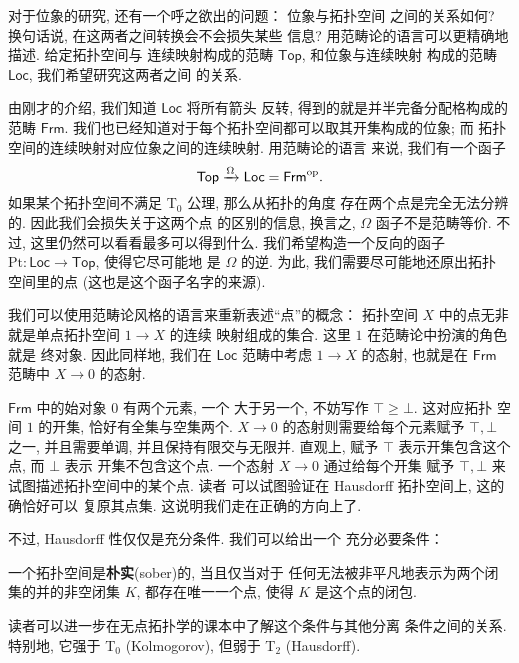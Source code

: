 对于位象的研究, 还有一个呼之欲出的问题： 位象与拓扑空间
之间的关系如何? 换句话说, 在这两者之间转换会不会损失某些
信息? 用范畴论的语言可以更精确地描述. 给定拓扑空间与
连续映射构成的范畴 \(\mathsf{Top}\), 和位象与连续映射
构成的范畴 \(\mathsf{Loc}\), 我们希望研究这两者之间
的关系.

由刚才的介绍, 我们知道 \(\mathsf{Loc}\) 将所有箭头
反转, 得到的就是并半完备分配格构成的范畴 \(\mathsf{Frm}\).
我们也已经知道对于每个拓扑空间都可以取其开集构成的位象; 而
拓扑空间的连续映射对应位象之间的连续映射. 用范畴论的语言
来说, 我们有一个函子
\[\mathsf{Top} \xrightarrow{\Omega} \mathsf{Loc}
= \mathsf{Frm}^\mathrm{op}.\]
如果某个拓扑空间不满足 T\(_0\) 公理, 那么从拓扑的角度
存在两个点是完全无法分辨的. 因此我们会损失关于这两个点
的区别的信息, 换言之, \(\Omega\) 函子不是范畴等价.
不过, 这里仍然可以看看最多可以得到什么.
我们希望构造一个反向的函子 \(\mathrm{Pt} :
\mathsf{Loc} \to \mathsf{Top}\), 使得它尽可能地
是 \(\Omega\) 的逆. 为此, 我们需要尽可能地还原出拓扑
空间里的点 (这也是这个函子名字的来源).

我们可以使用范畴论风格的语言来重新表述“点”的概念： 拓扑空间
\(X\) 中的点无非就是单点拓扑空间 \(1 \to X\) 的连续
映射组成的集合. 这里 \(1\) 在范畴论中扮演的角色就是
终对象. 因此同样地, 我们在 \(\mathsf{Loc}\) 范畴中考虑
\(1 \to X\) 的态射, 也就是在 \(\mathsf{Frm}\) 范畴中
\(X \to 0\) 的态射.

\(\mathsf{Frm}\) 中的始对象 \(0\) 有两个元素, 一个
大于另一个, 不妨写作 \(\top \ge \bot\). 这对应拓扑
空间 \(1\) 的开集, 恰好有全集与空集两个.
\(X \to 0\) 的态射则需要给每个元素赋予 \(\top, \bot\)
之一, 并且需要单调, 并且保持有限交与无限并. 直观上,
赋予 \(\top\) 表示开集包含这个点, 而 \(\bot\) 表示
开集不包含这个点. 一个态射 \(X \to 0\) 通过给每个开集
赋予 \(\top,\bot\) 来试图描述拓扑空间中的某个点. 读者
可以试图验证在 Hausdorff 拓扑空间上, 这的确恰好可以
复原其点集. 这说明我们走在正确的方向上了.

不过, Hausdorff 性仅仅是充分条件. 我们可以给出一个
充分必要条件：
\begin{definition}
一个拓扑空间是\textbf{朴实}(sober)的, 当且仅当对于
任何无法被非平凡地表示为两个闭集的并的非空闭集 \(K\),
都存在唯一一个点, 使得 \(K\) 是这个点的闭包.
\end{definition}
读者可以进一步在无点拓扑学的课本中了解这个条件与其他分离
条件之间的关系. 特别地, 它强于 T\(_0\) (Kolmogorov),
但弱于 T\(_2\) (Hausdorff).

